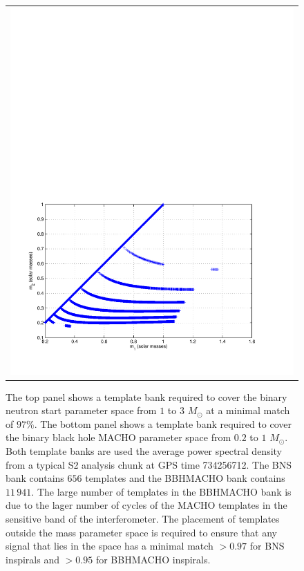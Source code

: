 \begin{figure}[p]
\begin{tabular}{c}
\includegraphics[width=\linewidth]{figures/pipeline/macho_bank}
\end{tabular}
\caption{\label{f:s2_banks}%
The top panel shows a template bank required to cover the binary neutron start
parameter space from $1$ to $3$ $M_\odot$ at a minimal match of $97\%$.  The
bottom panel shows a template bank required to cover the binary black hole
MACHO parameter space from $0.2$ to $1$ $M_\odot$. Both template banks are
used the average power spectral density from a typical S2 analysis chunk at
GPS time 734256712. The BNS bank contains $656$ templates and the BBHMACHO
bank contains $11\,941$. The large number of templates in the BBHMACHO bank is
due to the lager number of cycles of the MACHO templates in the sensitive band
of the interferometer. The placement of templates outside the mass parameter
space is required to ensure that any signal that lies in the space has a
minimal match $> 0.97$ for BNS inspirals and $> 0.95$ for BBHMACHO inspirals.
}
\end{figure}

